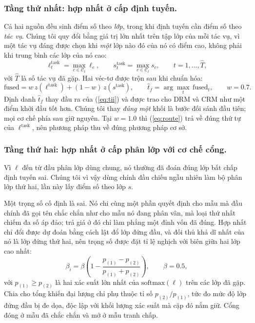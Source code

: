 \documentclass[runningheads]{llncs}
\begin{document}
\subsubsection{Tầng thứ nhất: hợp nhất ở cấp định tuyến.}
Cả hai nguồn đều sinh điểm số theo \emph{lớp}, trong khi định tuyến cần điểm số
theo \emph{tác vụ}. Chúng tôi quy đổi bằng giá trị lớn nhất trên tập lớp của mỗi
tác vụ, vì một tác vụ đáng được chọn khi \emph{một} lớp nào đó của nó có điểm
cao, không phải khi trung bình các lớp của nó cao:
\begin{equation}
\ell^{\mathrm{task}}_t = \max_{c \in \mathcal{C}_t} \ell_c ,
\qquad
s^{\mathrm{task}}_t = \max_{c \in \mathcal{C}_t} s_c ,
\qquad t = 1,\dots,\hat{T},
\label{eq:taskscore}
\end{equation}
với $\hat{T}$ là số tác vụ đã gặp. Hai véc-tơ được trộn sau khi chuẩn hóa:
\begin{equation}
\mathrm{fused} = w\, z(\ell^{\mathrm{task}}) + (1-w)\, z(s^{\mathrm{task}}),
\qquad
\hat{t}_f = \arg\max_t\, \mathrm{fused}_t ,
\qquad w = 0.7 .
\label{eq:route}
\end{equation}
Định danh $\hat{t}_f$ thay đầu ra của (\ref{eq:tii}) và được trao cho DRM và CRM
như một điểm khởi đầu tốt hơn. Chúng tôi thay \emph{đúng một} khối là bước đối
sánh đầu tiên; mọi cơ chế phía sau giữ nguyên. Tại $w = 1.0$ thì
(\ref{eq:route}) trả về đúng thứ tự của $\ell^{\mathrm{task}}$, nên phương pháp
thu về đúng phương pháp cơ sở.

\subsubsection{Tầng thứ hai: hợp nhất ở cấp phân lớp với cơ chế cổng.}
Vì $\ell$ đến từ đầu phân lớp dùng chung, nó thường đã đoán đúng lớp bất chấp
định tuyến sai. Chúng tôi vì vậy dùng chính đầu chiếu ngẫu nhiên làm bộ phân lớp
thứ hai, lần này lấy điểm số theo lớp $s$.

Một trọng số cố định là sai. Nó chi cùng một phần quyết định cho mẫu mà đầu chính
đã gọi tên chắc chắn như cho mẫu nó đang phân vân, mà loại thứ nhất chiếm đa số
áp đảo; trả giá ở đó chỉ làm phẳng một đỉnh vốn đã đúng. Hợp nhất chỉ đổi được dự
đoán bằng cách lật đổ lớp đứng đầu, và đối thủ khả dĩ nhất của nó là lớp đứng thứ
hai, nên trọng số được đặt tỉ lệ nghịch với biên giữa hai lớp cao nhất:
\begin{equation}
\beta_i = \beta \left( 1 - \frac{p_{(1)} - p_{(2)}}{p_{(1)} + p_{(2)}} \right),
\qquad \beta = 0.5 ,
\label{eq:gate}
\end{equation}
với $p_{(1)} \geq p_{(2)}$ là hai xác suất lớn nhất của $\mathrm{softmax}(\ell)$
trên các lớp đã gặp. Chia cho tổng khiến đại lượng chỉ phụ thuộc tỉ số
$p_{(2)}/p_{(1)}$, tức đo mức độ lớp đứng đầu bị đe dọa, độc lập với khối lượng
xác suất mà cặp đó nắm giữ. Cổng đóng ở mẫu đã chắc chắn và mở ở mẫu tranh chấp.
\end{document}

